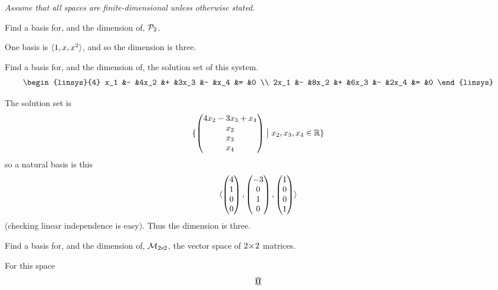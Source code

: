 \begin{exercises}
  \item[{\em Assume that all spaces are finite-dimensional unless otherwise
    stated.}]
  \recommended \item  
    Find a basis for, and the dimension of, \(  \mathcal{P}_2 \).
    \begin{answer}
      One basis is \( \langle1,x,x^2\rangle \), and so
      the dimension is three.
    \end{answer}
  \item 
    Find a basis for, and the dimension of, the solution set of
    this system.
    \begin{equation*}
      \begin{linsys}{4}
         x_1  &-  &4x_2  &+  &3x_3  &-  &x_4  &=  &0  \\
        2x_1  &-  &8x_2  &+  &6x_3  &-  &2x_4 &=  &0  
      \end{linsys}
    \end{equation*}
    \begin{answer}
      The solution set is
      \begin{equation*}
        \mbox{$\{\begin{pmatrix} 4x_2-3x_3+x_4 \\ x_2 \\ x_3 \\ x_4 \end{pmatrix}
               \bigm| x_2,x_3,x_4\in\mathbb{R}\}$}
      \end{equation*}
      so a natural basis is this
      \begin{equation*}
       \langle\begin{pmatrix} 4 \\ 1 \\ 0 \\ 0 \end{pmatrix},
                   \begin{pmatrix} -3 \\ 0 \\ 1 \\ 0 \end{pmatrix},
                   \begin{pmatrix} 1 \\ 0 \\ 0 \\ 1 \end{pmatrix}  \rangle
      \end{equation*}  
      (checking linear independence is easy).
      Thus the dimension is three.
    \end{answer}
  \recommended \item
    Find a basis for, and the dimension of, \( \mathcal{M}_{2 \! \times \! 2} \),
    the vector space of \( 2 \! \times \! 2 \) matrices.
    \begin{answer}
      For this space
      \begin{equation*}
        \mbox{$\{\begin{pmatrix}

\end{pmatrix}\}$}
\end{equation*}
\end{answer}
\end{exercises}
